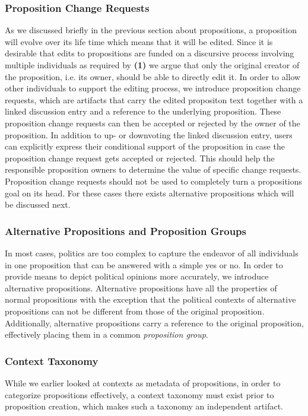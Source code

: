 \subsubsection{Proposition Change Requests}
\label{ssec:Proposition_Change_Requests}
As we discussed briefly in the previous section about propositions, a proposition will evolve over its life time which means that it will be edited.
Since it is desirable that edits to propositions are funded on a discursive process involving multiple individuals as required by \textbf{(1)} we argue that only the original creator of the proposition, i.e. its owner, should be able to directly edit it.
In order to allow other individuals to support the editing process, we introduce proposition change requests, which are artifacts that carry the edited propositon text together with a linked discussion entry and a reference to the underlying proposition. 
These proposition change requests can then be accepted or rejected by the owner of the proposition.
In addition to up- or downvoting the linked discussion entry, users can explicitly express their conditional support of the proposition in case the proposition change request gets accepted or rejected.
This should help the responsible proposition owners to determine the value of specific change requests.
Proposition change requests should not be used to completely turn a propositions goal on its head.
For these cases there exists alternative propositions which will be discussed next.

\subsubsection{Alternative Propositions and Proposition Groups}
\label{ssec:AltProposition}
In most cases, politics are too complex to capture the endeavor of all individuals in one proposition that can be answered with a simple yes or no.
In order to provide means to depict political opinions more accurately, we introduce alternative propositions.
Alternative propositions have all the properties of normal propositions with the exception that the political contexts of alternative propositions can not be different from those of the original proposition.
Additionally, alternative propositions carry a reference to the original proposition, effectively placing them in a common \emph{proposition group}.

\subsubsection{Context Taxonomy}
\label{sec:Model_Contexts}
While we earlier looked at contexts as metadata of propositions, in order to categorize propositions effectively, a context taxonomy must exist prior to proposition creation, which makes such a taxonomy an independent artifact.


